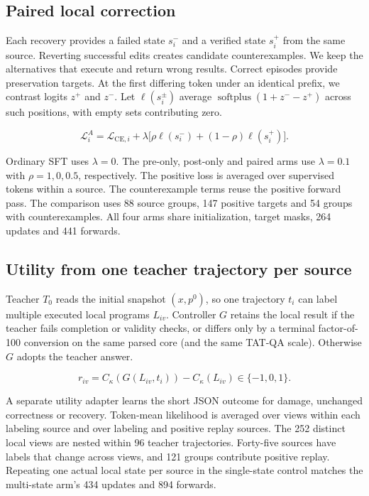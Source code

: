 \documentclass[10pt,letterpaper,conference]{IEEEtran}
\begin{document}
\subsection{Paired local correction}\label{paired-local-correction}

Each recovery provides a failed state \(s_i^-\) and a verified state \(s_i^+\) from the same source. Reverting successful edits creates candidate counterexamples. We keep the alternatives that execute and return wrong results. Correct episodes provide preservation targets. At the first differing token under an identical prefix, we contrast logits \(z^+\) and \(z^-\). Let \(\ell(s_i^\pm)\) average \(\operatorname{softplus}(1+z^- -z^+)\) across such positions, with empty sets contributing zero.

\[
\mathcal L_i^A=\mathcal L_{\mathrm{CE},i}
+\lambda\big[\rho\ell(s_i^-)+(1-\rho)\ell(s_i^+)\big].
\tag{2}
\]

Ordinary SFT uses \(\lambda=0\). The pre-only, post-only and paired arms use \(\lambda=0.1\) with \(\rho=1,0,0.5\), respectively. The positive loss is averaged over supervised tokens within a source. The counterexample terms reuse the positive forward pass. The comparison uses 88 source groups, 147 positive targets and 54 groups with counterexamples. All four arms share initialization, target masks, 264 updates and 441 forwards.

\subsection{Utility from one teacher trajectory per source}\label{utility-from-one-teacher-trajectory-per-source}

Teacher \(T_0\) reads the initial snapshot \((x,p^0)\), so one trajectory \(t_i\) can label multiple executed local programs \(L_{iv}\). Controller \(G\) retains the local result if the teacher fails completion or validity checks, or differs only by a terminal factor-of-100 conversion on the same parsed core (and the same TAT-QA scale). Otherwise \(G\) adopts the teacher answer.

\[
r_{iv}=C_\kappa(G(L_{iv},t_i))-C_\kappa(L_{iv})\in\{-1,0,1\}.
\tag{3}
\]

A separate utility adapter learns the short JSON outcome for damage, unchanged correctness or recovery. Token-mean likelihood is averaged over views within each labeling source and over labeling and positive replay sources. The 252 distinct local views are nested within 96 teacher trajectories. Forty-five sources have labels that change across views, and 121 groups contribute positive replay. Repeating one actual local state per source in the single-state control matches the multi-state arm's 434 updates and 894 forwards.
\end{document}

